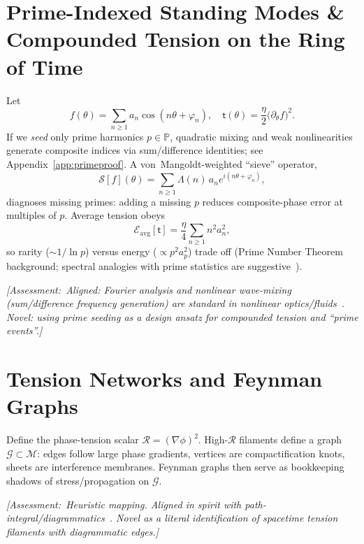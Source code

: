 \documentclass[reprint,amsmath,amssymb,aps,pra]{revtex4-2} %
\newcommand{\Primes}{\mathbb{P}}              %
\newcommand{\M}{\mathcal{M}}                   %
\newcommand{\R}{\mathcal{R}}                   %
\newcommand{\grad}{\nabla}                     %
\newcommand{\Eavg}{\mathcal{E}_{\!\mathrm{avg}}}
\newcommand{\taufield}{\mathsf{t}}             %
\newcommand{\Assessment}[1]{\par\smallskip\noindent\textit{\color{blue}[Assessment:\ #1]}\par\smallskip}
\begin{document}
\section{Prime-Indexed Standing Modes \& Compounded Tension on the Ring of Time}
Let
  \begin{equation}
    f(\theta)=\sum_{n\ge1} a_n \cos{(n\theta+\varphi_n)},\quad
    \taufield{(\theta)}=\frac{\eta}{2}\big(\partial_\theta f\big)^2.
  \label{eq:fourier-tension}
\end{equation}
If we \emph{seed} only prime harmonics $p\in\Primes$, quadratic mixing and weak nonlinearities generate composite indices via sum/difference identities; see Appendix~\ref{app:primeproof}. A von~Mangoldt-weighted ``sieve'' operator,
\begin{equation}
\mathcal{S}[f](\theta)=\sum_{n\ge1}\Lambda(n)\, a_n e^{i(n\theta+\varphi_n)},
  \label{eq:vonmangoldt}
\end{equation}
diagnoses missing primes: adding a missing $p$ reduces composite-phase error at multiples of $p$. Average tension obeys
\begin{equation}
\Eavg[\taufield]=\frac{\eta}{4}\sum_{n\ge1} n^2 a_n^2,
  \label{eq:avg-tension}
\end{equation}
so rarity ($\sim 1/\ln p$) versus energy ($\propto p^2 a_p^2$) trade off (Prime Number Theorem background; spectral analogies with prime statistics are suggestive~\cite{Montgomery1973,BerryKeating1999}).

\Assessment{Aligned: Fourier analysis and nonlinear wave-mixing (sum/difference frequency generation) are standard in nonlinear optics/fluids~\cite{BoydNLO}. Novel: using prime seeding as a \emph{design ansatz} for compounded tension and ``prime events''.}

\section{Tension Networks and Feynman Graphs}
Define the phase-tension scalar $\R = (\grad\phi)^2$. High-$\R$ filaments define a graph $\mathcal{G}\subset\M$: edges follow large phase gradients, vertices are compactification knots, sheets are interference membranes. Feynman graphs then serve as bookkeeping shadows of stress/propagation on $\mathcal{G}$.

\Assessment{Heuristic mapping. Aligned in spirit with path-integral/diagrammatics~\cite{Feynman1948,Dyson1949}. Novel as a literal identification of spacetime tension filaments with diagrammatic edges.}
\end{document}
